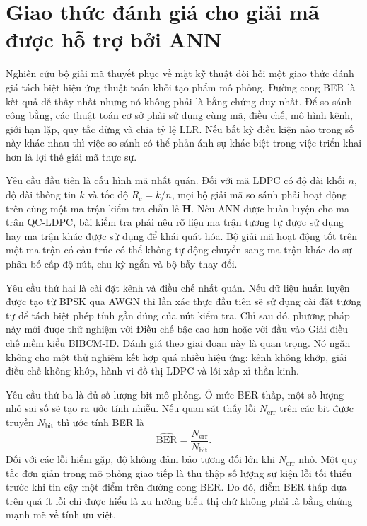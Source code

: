 \section{Giao thức đánh giá cho giải mã được hỗ trợ bởi ANN}
Nghiên cứu bộ giải mã thuyết phục về mặt kỹ thuật đòi hỏi một giao thức đánh giá tách biệt hiệu ứng thuật toán khỏi tạo phẩm mô phỏng. Đường cong BER là kết quả dễ thấy nhất nhưng nó không phải là bằng chứng duy nhất. Để so sánh công bằng, các thuật toán cơ sở phải sử dụng cùng mã, điều chế, mô hình kênh, giới hạn lặp, quy tắc dừng và chia tỷ lệ LLR. Nếu bất kỳ điều kiện nào trong số này khác nhau thì việc so sánh có thể phản ánh sự khác biệt trong việc triển khai hơn là lợi thế giải mã thực sự.

Yêu cầu đầu tiên là cấu hình mã nhất quán. Đối với mã LDPC có độ dài khối $n$, độ dài thông tin $k$ và tốc độ $R_c=k/n$, mọi bộ giải mã so sánh phải hoạt động trên cùng một ma trận kiểm tra chẵn lẻ $\mathbf{H}$. Nếu ANN được huấn luyện cho ma trận QC-LDPC, bài kiểm tra phải nêu rõ liệu ma trận tương tự được sử dụng hay ma trận khác được sử dụng để khái quát hóa. Bộ giải mã hoạt động tốt trên một ma trận có cấu trúc có thể không tự động chuyển sang ma trận khác do sự phân bố cấp độ nút, chu kỳ ngắn và bộ bẫy thay đổi.

Yêu cầu thứ hai là cài đặt kênh và điều chế nhất quán. Nếu dữ liệu huấn luyện được tạo từ BPSK qua AWGN thì lần xác thực đầu tiên sẽ sử dụng cài đặt tương tự để tách biệt phép tính gần đúng của nút kiểm tra. Chỉ sau đó, phương pháp này mới được thử nghiệm với Điều chế bậc cao hơn hoặc với đầu vào Giải điều chế mềm kiểu BIBCM-ID. Đánh giá theo giai đoạn này là quan trọng. Nó ngăn không cho một thử nghiệm kết hợp quá nhiều hiệu ứng: kênh không khớp, giải điều chế không khớp, hành vi đồ thị LDPC và lỗi xấp xỉ thần kinh.

Yêu cầu thứ ba là đủ số lượng bit mô phỏng. Ở mức BER thấp, một số lượng nhỏ sai số sẽ tạo ra ước tính nhiễu. Nếu quan sát thấy lỗi $N_{\mathrm{err}}$ trên các bit được truyền $N_{\mathrm{bit}}$ thì ước tính BER là
\begin{equation}
  \widehat{\mathrm{BER}}=\frac{N_{\mathrm{err}}}{N_{\mathrm{bit}}}.
\end{equation}
Đối với các lỗi hiếm gặp, độ không đảm bảo tương đối lớn khi $N_{\mathrm{err}}$ nhỏ. Một quy tắc đơn giản trong mô phỏng giao tiếp là thu thập số lượng sự kiện lỗi tối thiểu trước khi tin cậy một điểm trên đường cong BER. Do đó, điểm BER thấp dựa trên quá ít lỗi chỉ được hiểu là xu hướng biểu thị chứ không phải là bằng chứng mạnh mẽ về tính ưu việt.


